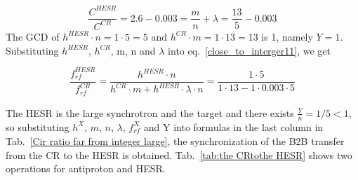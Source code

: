 \begin{equation}
\frac{C^{\mathit{HESR}}}{C^{\mathit{CR}}}=2.6-0.003=\frac{m}{n}+ \lambda = \frac{13}{5}-0.003
\end{equation}
The GCD of $h^{\mathit{HESR}}\cdot n=1\cdot5=5$ and $h^{\mathit{CR}} \cdot m=1\cdot 13=13$ is 1, namely $Y=1$. Substituting $h^{\mathit{HESR}}$, $h^{\mathit{CR}}$, m, n and $\lambda$ into eq.~\ref{close_to_interger11}, we get

\begin{equation} 
\frac{f_{\mathit{rf}}^{\mathit{HESR}}}{f_{\mathit{rf}}^{\mathit{CR}}}=\frac{h^{\mathit{HESR}}\cdot n}{h^{\mathit{CR}} \cdot m+ h^{\mathit{HESR}} \cdot\lambda\cdot n}=\frac{1\cdot 5}{1 \cdot 13- 1 \cdot 0.003\cdot 5}
\end{equation}

The HESR is the large synchrotron and the target and there exists $\frac{Y}{n}=1/5<1$, so substituting $h^X$, $m$, $n$, $\lambda$, $f_{\mathit{rf}}^{X}$ and Y into formulas in the last column in Tab.~\ref{Cir ratio far from integer large}, the synchronization of the B2B transfer from the CR to the HESR is obtained. Tab.~\ref{tab:the CRtothe HESR} shows two operations for antiproton and HESR.


